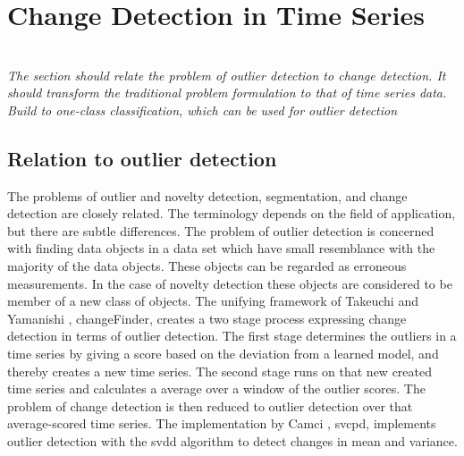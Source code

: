 \section{Change Detection in Time Series}\label{sec:change_detection_time_series}
 \\
\emph{The section should relate the problem of outlier detection to change detection.
It should transform the traditional problem formulation to that of time series data.
Build to one-class classification, which can be used for outlier detection}

\subsection{Relation to outlier detection}
The problems of outlier and novelty detection, segmentation, and change detection are closely related.
The terminology depends on the field of application, but there are subtle differences.
The problem of outlier detection is concerned with finding data objects in a data set which have small resemblance with the majority of the data objects.
These objects can be regarded as erroneous measurements.
In the case of novelty detection these objects are considered to be member of a new class of objects.
The unifying framework of Takeuchi and Yamanishi \cite{takeuchi2006unifying}, \gls{changeFinder}, creates a two stage process expressing change detection in terms of outlier detection.
The first stage determines the outliers in a time series by giving a score based on the deviation from a learned model, and thereby creates a new time series.
The second stage runs on that new created time series and calculates a average over a window of the outlier scores.
The problem of change detection is then reduced to outlier detection over that average-scored time series.
The implementation by Camci \cite{camci2010change}, \gls{svcpd}, implements outlier detection with the \gls{svdd} algorithm to detect changes in mean and variance.

